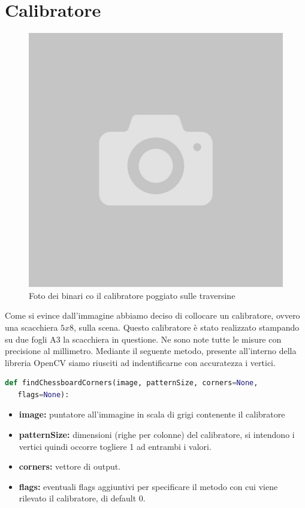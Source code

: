 \documentclass[twoside]{supsistudent}
\begin{document}
\section{Calibratore}
\begin{figure}[H]
  \center
  \includegraphics[scale=0.5]{images/empty.jpg}
  \caption{Foto dei binari co il calibratore poggiato sulle traversine}
\end{figure}
Come si evince dall'immagine abbiamo deciso di collocare un calibratore, ovvero una scacchiera $5 x 8$, sulla scena. 
Questo calibratore è stato realizzato stampando su due fogli A3 la scacchiera in questione. Ne sono note tutte le misure con 
precisione al millimetro. Mediante il seguente metodo, presente all'interno della libreria OpenCV siamo riusciti ad indentificarne con
accuratezza i vertici. 
\begin{lstlisting}[language=Python]
  def findChessboardCorners(image, patternSize, corners=None,
   flags=None):
\end{lstlisting}
\begin{itemize}
  \item \textbf{image:} puntatore all'immagine in scala di grigi contenente il calibratore
  \item \textbf{patternSize:} dimensioni (righe per colonne) del calibratore, si intendono i vertici quindi occorre togliere 1 ad entrambi i valori.
  \item \textbf{corners:} vettore di output.
  \item \textbf{flags:} eventuali flags aggiuntivi per specificare il metodo con cui viene rilevato il calibratore, di default 0.
\end{itemize}
\end{document}

